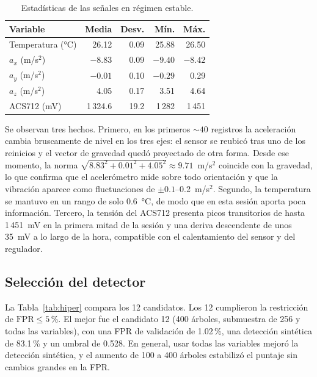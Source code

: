 \documentclass[10pt,twocolumn]{article}
\begin{document}
\begin{table}[htbp]
\centering
\caption{Estadísticas de las señales en régimen estable.}
\label{tab:estadisticos}
\footnotesize
\begin{tabular}{@{}lrrrr@{}}
\toprule
\textbf{Variable} & \textbf{Media} & \textbf{Desv.} & \textbf{Mín.} & \textbf{Máx.} \\
\midrule
Temperatura (°C) & 26.12 & 0.09 & 25.88 & 26.50 \\
$a_x$ (m/s$^2$) & $-8.83$ & 0.09 & $-9.40$ & $-8.42$ \\
$a_y$ (m/s$^2$) & $-0.01$ & 0.10 & $-0.29$ & 0.29 \\
$a_z$ (m/s$^2$) & 4.05 & 0.17 & 3.51 & 4.64 \\
ACS712 (mV) & 1\,324.6 & 19.2 & 1\,282 & 1\,451 \\
\bottomrule
\end{tabular}
\end{table}

Se observan tres hechos. Primero, en los primeros ${\sim}40$ registros la aceleración cambia
bruscamente de nivel en los tres ejes: el sensor se reubicó tras uno de los reinicios y el vector
de gravedad quedó proyectado de otra forma. Desde ese momento, la norma
$\sqrt{8.83^2+0.01^2+4.05^2}\approx 9.71$~m/s$^2$ coincide con la gravedad, lo que confirma que el
acelerómetro mide sobre todo orientación y que la vibración aparece como fluctuaciones de
$\pm0.1$--0.2~m/s$^2$. Segundo, la temperatura se mantuvo en un rango de solo 0.6~°C, de modo que
en esta sesión aporta poca información. Tercero, la tensión del ACS712 presenta picos transitorios
de hasta 1\,451~mV en la primera mitad de la sesión y una deriva descendente de unos 35~mV a lo
largo de la hora, compatible con el calentamiento del sensor y del regulador.

\subsection{Selección del detector}

La Tabla~\ref{tab:hiper} compara los 12 candidatos. Los 12 cumplieron la restricción de
$\mathrm{FPR}\leq5$\,\%. El mejor fue el candidato 12 (400 árboles, submuestra de 256 y todas las
variables), con una FPR de validación de 1.02\,\%, una detección sintética de 83.1\,\% y un umbral
de 0.528. En general, usar todas las variables mejoró la detección sintética, y el aumento de 100 a
400 árboles estabilizó el puntaje sin cambios grandes en la FPR.
\end{document}
